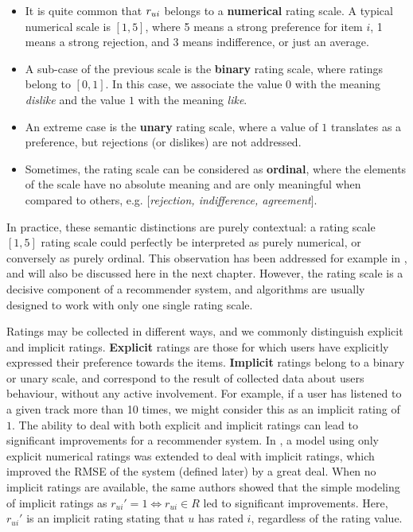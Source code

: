 \begin{itemize}
  \item It is quite common that  $r_{ui}$ belongs to a \textbf{numerical} rating
    scale. A typical numerical scale is $[1, 5]$, where  5 means a strong
    preference for item $i$, 1 means a strong rejection, and 3 means
    indifference, or just an average.
  \item A sub-case of the previous scale is the \textbf{binary} rating scale,
    where ratings belong to $[0, 1]$. In this case, we associate the value $0$
    with the meaning \textit{dislike} and the value $1$ with the meaning
    \textit{like}.
  \item An extreme case is the \textbf{unary} rating scale, where a value of
    $1$ translates as a preference, but rejections (or dislikes) are not
    addressed.
  \item Sometimes, the rating scale can be considered as \textbf{ordinal},
    where the elements of the scale have no absolute meaning and are only
    meaningful when compared to others, e.g. $[$\textit{rejection, indifference,
    agreement}$]$.
\end{itemize}
In practice, these semantic distinctions are purely contextual: a rating
scale $[1, 5]$ rating scale could perfectly be interpreted as purely numerical,
or conversely as purely ordinal. This observation has been addressed for
example in \cite{KorSillRECSYS11}, and will also be discussed here in the next
chapter. However, the rating scale is a decisive component of a recommender
system, and algorithms are usually designed to work with only one single rating
scale.

Ratings may be collected in different ways, and we commonly distinguish explicit and
implicit ratings. \textbf{Explicit} ratings are those for which users have
explicitly expressed their preference towards the items. \textbf{Implicit}
ratings belong to a binary or unary scale, and correspond to the result of
collected data about users behaviour, without any active involvement. For
example, if a user has listened to a given track more than 10 times, we might
consider this as an implicit rating of $1$. The ability to deal with both
explicit and implicit ratings can lead to significant improvements for a
recommender system. In \cite{KorSillRECSYS11}, a model using only explicit
numerical ratings was extended to deal with implicit ratings, which improved
the RMSE of the system (defined later) by a great deal. When no implicit
ratings are available, the same authors showed that the simple modeling of
implicit ratings as $r_{ui}' = 1 \iff r_{ui} \in R$ led to significant
improvements. Here, $r_{ui}'$ is an implicit rating stating that $u$ has rated
$i$, regardless of the rating value.

